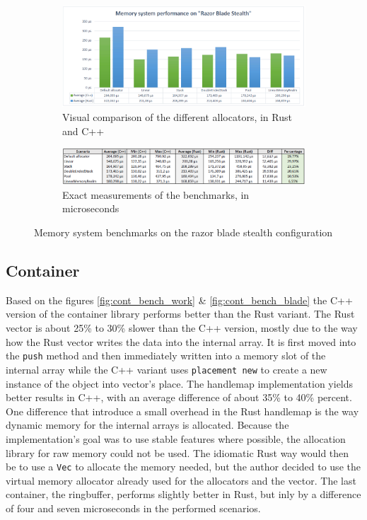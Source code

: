 \clearpage

\begin{figure}[h!]
	\centering
	\begin{subfigure}[b]{\textwidth}
		\includegraphics[width=1\linewidth]{PICs/mem_bench_blade.png}
		\caption{Visual comparison of the different allocators, in Rust and C++}
		\label{fig:Ng1} 
	\end{subfigure}
	
	\begin{subfigure}[b]{\textwidth}
		\includegraphics[width=1\linewidth]{PICs/mem_bench_blade_data.png}
		\caption{Exact measurements of the benchmarks, in microseconds}
		\label{fig:Ng2}
	\end{subfigure}
	
	\caption[Memory benchmarks blade]{Memory system benchmarks on the razor blade stealth configuration}
\end{figure}

\clearpage

\subsection{Container}

Based on the figures \ref{fig:cont_bench_work} \& \ref{fig:cont_bench_blade} the C++ version of the container library performs better than the Rust variant. The Rust vector is about 25\% to 30\% slower than the C++ version, mostly due to the way how the Rust vector writes the data into the internal array. It is first moved into the \texttt{push} method and then immediately written into a memory slot of the internal array while the C++ variant uses \texttt{placement new} to create a new instance of the object into vector's place. 
The handlemap implementation yields better results in C++, with an average difference of about 35\% to 40\% percent. One difference that introduce a small overhead in the Rust handlemap is the way dynamic memory for the internal arrays is allocated. Because the implementation's goal was to use stable features where possible, the allocation library for raw memory could not be used. The idiomatic Rust way would then be to use a \texttt{Vec} to allocate the memory needed, but the author decided to use the virtual memory allocator already used for the allocators and the vector. 
The last container, the ringbuffer, performs slightly better in Rust, but inly by a difference of four and seven microseconds in the performed scenarios. 

